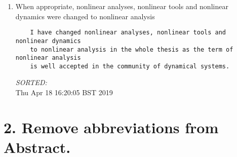 \documentclass[12pt]{article}
\begin{document}
\begin{enumerate}
\item  	When appropriate, nonlinear analyses, nonlinear tools and 
	nonlinear dynamics were changed to nonlinear analysis
	\begin{verbatim}
	I have changed nonlinear analyses, nonlinear tools and nonlinear dynamics 
	to nonlinear analysis in the whole thesis as the term of nonlinear analysis 
	is well accepted in the community of dynamical systems.
	\end{verbatim}
	\textit{
	SORTED:  
	}
	\\



Thu Apr 18 16:20:05 BST 2019

\end{enumerate}


\section*{2. Remove abbreviations from Abstract.}
\end{document}
